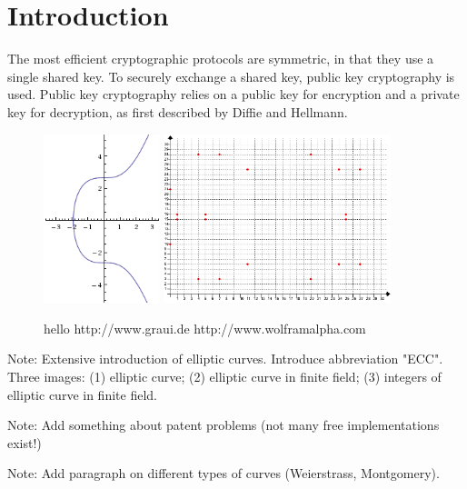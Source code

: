 \section{Introduction}

The most efficient cryptographic protocols are symmetric, in that they use a single shared key.
To securely exchange a shared key, public key cryptography is used. Public key cryptography
relies on a public key for encryption and a private key for decryption, as first described by
Diffie and Hellmann.

\begin{figure}[htb]
	\centering
	\includegraphics[width=0.30\textwidth]{introduction/secp256k1-graph}
	\includegraphics[width=0.59\textwidth]{introduction/secp256k1-graph-over-field-p31}
	\caption{hello http://www.graui.de http://www.wolframalpha.com}
	\label{fig:graphs}
\end{figure}

Note: Extensive introduction of elliptic curves. Introduce abbreviation "ECC". Three images:
(1) elliptic curve; (2) elliptic curve in finite field; (3) integers of elliptic curve in finite
field.

Note: Add something about patent problems (not many free implementations exist!)

Note: Add paragraph on different types of curves (Weierstrass, Montgomery).

